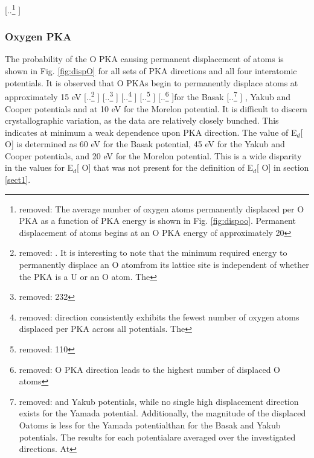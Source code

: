 \documentclass[review]{elsarticle} %
\providecommand{\DIFaddtex}[1]{{\protect\color{blue} \sf #1}} %
\providecommand{\DIFdeltex}[1]{{\protect\color{red} [..\footnote{removed: #1} ]}} %
\providecommand{\DIFaddbegin}{} %
\providecommand{\DIFaddend}{} %
\providecommand{\DIFdelbegin}{} %
\providecommand{\DIFdelend}{} %
\providecommand{\DIFadd}[1]{\texorpdfstring{\DIFaddtex{#1}}{#1}} %
\providecommand{\DIFdel}[1]{\texorpdfstring{\DIFdeltex{#1}}{}} %
\newcommand{\DIFscaledelfig}{0.5}
\newlength{\DIFdelgraphicswidth} %
\newlength{\DIFdelgraphicsheight} %
\newcommand{\DIFaddincludegraphics}[2][]{{\color{blue}\fbox{\DIFOincludegraphics[#1]{#2}}}} %
\newcommand{\DIFdelincludegraphics}[2][]{%
\sbox{\DIFdelgraphicsbox}{\DIFOincludegraphics[#1]{#2}}%
\settoboxwidth{\DIFdelgraphicswidth}{\DIFdelgraphicsbox} %
\settoboxtotalheight{\DIFdelgraphicsheight}{\DIFdelgraphicsbox} %
\scalebox{\DIFscaledelfig}{%
\parbox[b]{\DIFdelgraphicswidth}{\usebox{\DIFdelgraphicsbox}\\[-\baselineskip] \rule{\DIFdelgraphicswidth}{0em}}\llap{\resizebox{\DIFdelgraphicswidth}{\DIFdelgraphicsheight}{%
\setlength{\unitlength}{\DIFdelgraphicswidth}%
\begin{picture}(1,1)%
\thicklines\linethickness{2pt} %
{\color[rgb]{1,0,0}\put(0,0){\framebox(1,1){}}}%
{\color[rgb]{1,0,0}\put(0,0){\line( 1,1){1}}}%
{\color[rgb]{1,0,0}\put(0,1){\line(1,-1){1}}}%
\end{picture}%
}\hspace*{3pt}}} %
} %
\DeclareRobustCommand{\DIFaddbegin}{\DIFOaddbegin \let\includegraphics\DIFaddincludegraphics} %
\DeclareRobustCommand{\DIFaddend}{\DIFOaddend \let\includegraphics\DIFOincludegraphics} %
\DeclareRobustCommand{\DIFdelbegin}{\DIFOdelbegin \let\includegraphics\DIFdelincludegraphics} %
\DeclareRobustCommand{\DIFdelend}{\DIFOaddend \let\includegraphics\DIFOincludegraphics} %
\begin{document}
\DIFdelbegin \DIFdel{The average number of oxygen atoms permanently displaced per O PKA as a function of PKA energy is shown in Fig. \ref{fig:dispoo}. Permanent displacement of atoms begins at an O PKA energy of approximately 20 }\DIFdelend \DIFaddbegin \FloatBarrier

\subsubsection{\DIFadd{Oxygen PKA}}

\DIFadd{The probability of the O PKA causing permanent displacement of atoms is shown in Fig. \ref{fig:dispO} for all sets of PKA directions and all four interatomic potentials. It is observed that O PKAs begin to permanently displace atoms at approximately 15 }\DIFaddend eV \DIFdelbegin \DIFdel{. It is interesting to note that the minimum required energy to permanently displace an O atomfrom its lattice site is independent of whether the PKA is a U or an O atom.
The }%
\DIFdel{232}%
\DIFdel{direction consistently exhibits the fewest number of oxygen atoms displaced per PKA across all potentials. The }%
\DIFdel{110}%
\DIFdel{O PKA direction leads to the highest number of displaced O atoms }\DIFdelend for the Basak\DIFdelbegin \DIFdel{and Yakub potentials, while no single high displacement direction exists for the Yamada potential. Additionally, the magnitude of the displaced Oatoms is less for the Yamada potentialthan for the Basak and Yakub potentials. The results for each potentialare averaged over the investigated directions.
At }\DIFdelend \DIFaddbegin \DIFadd{, Yakub and Cooper potentials and at 10 eV for the Morelon potential. It is difficult to discern crystallographic variation, as the data are relatively closely bunched. This indicates at minimum a weak dependence upon PKA direction. The value of E$_d$}[\DIFadd{O}] \DIFadd{is determined as 60 eV for the Basak potential, 45 eV for the Yakub and Cooper potentials, and 20 eV for the Morelon potential. This is a wide disparity in the values for E$_d$}[\DIFadd{O}] \DIFadd{that was not present for the definition of E$_d$}[\DIFadd{O}] \DIFadd{in section \ref{sect1}.
}
\end{document}
